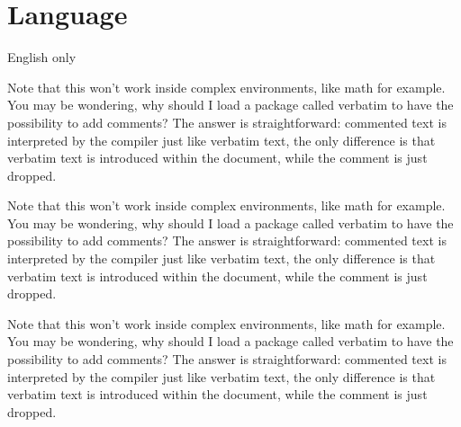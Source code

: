 \chapter{Language}
English only

Note that this won’t work inside complex environments, like math for example.
You may be wondering, why should I load a package called verbatim to have the
possibility to add comments? The answer is straightforward: commented text is
interpreted by the compiler just like verbatim text, the only difference is
that verbatim text is introduced within the document, while the comment is just
dropped.

Note that this won’t work inside complex environments, like math for example.
You may be wondering, why should I load a package called verbatim to have the
possibility to add comments? The answer is straightforward: commented text is
interpreted by the compiler just like verbatim text, the only difference is
that verbatim text is introduced within the document, while the comment is just
dropped.

Note that this won’t work inside complex environments, like math for example.
You may be wondering, why should I load a package called verbatim to have the
possibility to add comments? The answer is straightforward: commented text is
interpreted by the compiler just like verbatim text, the only difference is
that verbatim text is introduced within the document, while the comment is just
dropped.
